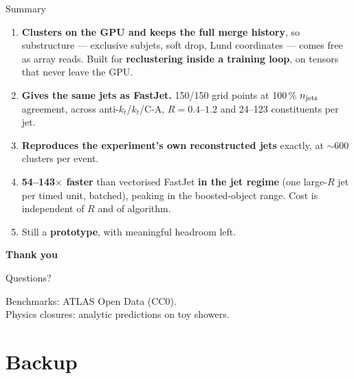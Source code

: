 \documentclass[aspectratio=169,10pt]{beamer}
\newcommand{\smallnote}[1]{{\footnotesize\color{fjgray} #1}}
\newcommand{\akt}{anti-$k_t$}
\begin{document}
\begin{frame}{Summary}
\begin{enumerate}
  \item \textbf{Clusters on the GPU and keeps the full merge history}, so
  substructure --- exclusive subjets, soft drop, Lund coordinates --- comes free
  as array reads. Built for \textbf{reclustering inside a training loop}, on
  tensors that never leave the GPU.
  \medskip
  \item \textbf{Gives the same jets as FastJet.} 150/150 grid points at 100\,\%
  $n_{\rm jets}$ agreement, across \akt/$k_t$/C-A, $R=0.4$--$1.2$ and 24--123
  constituents per jet.
  \medskip
  \item \textbf{Reproduces the experiment's own reconstructed jets} exactly, at
  $\sim$600 clusters per event.
  \medskip
  \item \textbf{54--143$\times$ faster} than vectorised FastJet \textbf{in the jet
  regime} (one large-$R$ jet per timed unit, batched), peaking in the
  boosted-object range. Cost is independent of $R$ and of algorithm.
  \medskip
  \item Still a \textcolor{fjorange}{\textbf{prototype}}, with meaningful headroom
  left.
\end{enumerate}
\end{frame}

\begin{frame}
\vfill
\begin{center}
{\Large\color{fjred}\textbf{Thank you}}
\medskip

{\large Questions?}
\vspace{2em}

\smallnote{Benchmarks: ATLAS Open Data (CC0).\\
Physics closures: analytic predictions on toy showers.}
\end{center}
\vfill
\end{frame}

\appendix
\section{Backup}
\end{document}

